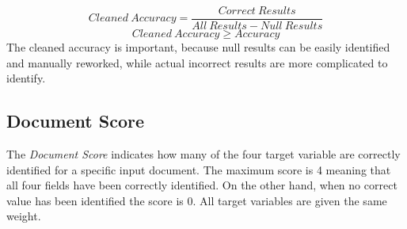 \[ Cleaned \ Accuracy = \frac{Correct \ Results}{All \ Results - Null \ Results}\] 
\[Cleaned \ Accuracy \geq Accuracy\]
The cleaned accuracy is important, because null results can be easily identified and manually reworked, while actual incorrect results are more complicated to identify.
\subsection{Document Score}
The \textit{Document Score} indicates how many of the four target variable are correctly identified for a specific input document.
The maximum score is 4 meaning that all four fields have been correctly identified. On the other hand, when no correct value has been identified
the score is 0. All target variables are given the same weight.